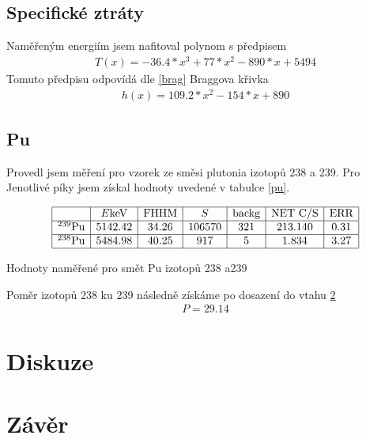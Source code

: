 \documentclass[a4paper,12pt]{article}
\begin{document}
\subsection{Specifické ztráty}
Naměřeným energiím jsem nafitoval polynom s předpisem
\begin{eqnarray}
T(x)=-36.4*x^3+77*x^2-890*x+5494
\end{eqnarray}
Tomuto předpisu odpovídá dle \ref{brag} Braggova křivka
\begin{eqnarray}
h(x)=109.2*x^2-154*x+890
\end{eqnarray}

\subsection{Pu}
Provedl jsem měření pro vzorek ze směsi plutonia izotopů 238 a 239. Pro Jenotlivé píky jsem získal hodnoty uvedené  v tabulce \ref{pu}.

\begin{table}
$$
\begin{array}{|c|c|c|c|c|c|c|}
\hline
&E\mbox{keV}&\mbox{FHHM}&S&\mbox{backg}&\mbox{NET C/S}& \mbox{ERR}\\ \hline
^{239}\mbox{Pu}&5142.42&34.26&106570&321&213.140&0.31\\ \hline
^{238}\mbox{Pu}&5484.98&40.25&917&5&1.834&3.27\\ \hline
\end{array}
$$
\caption{Hodnoty naměřené pro smět Pu izotopů 238 a239}
\label{pu}
\end{table}

Poměr izotopů 238 ku 239 následně získáme po dosazení do vtahu \ref{}
\begin{eqnarray}
P=29.14
\end{eqnarray}

\section{Diskuze}

\section{Závěr}
\end{document}
